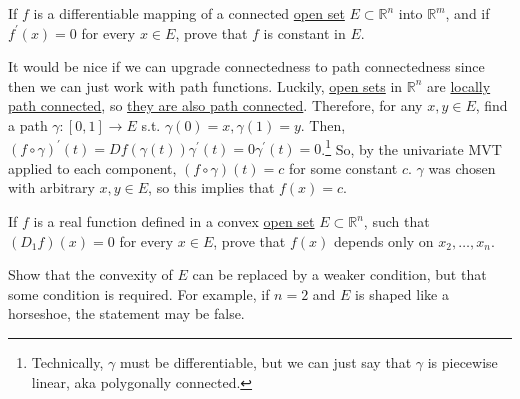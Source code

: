 	\begin{exercise}[Rudin 9.9]
		If $f$ is a differentiable mapping of a connected \hyperref[pst-def:open-set]{open set} $E\subset\mathbb{R}^n$ into $\mathbb{R}^m$, and if $f^\prime(x)=0$ for every $x\in E$, prove that $f$ is constant in $E$.
	\end{exercise}
	\begin{solution}
		It would be nice if we can upgrade connectedness to path connectedness since then we can just work with path functions. Luckily, \hyperref[pst-def:open-set]{open sets} in $\mathbb{R}^n$ are \hyperref[pst-def:locally_connected]{locally path connected}, so \hyperref[pst-thm:lpc_c_implies_pc]{they are also path connected}. Therefore, for any $x, y \in E$, find a path $\gamma: [0, 1] \to E$ s.t. $\gamma(0) = x, \gamma(1) = y$. Then, $(f \circ \gamma)^\prime (t) = Df(\gamma(t)) \gamma^\prime (t) = 0 \gamma^\prime(t) = 0$.\footnote{Technically, $\gamma$ must be differentiable, but we can just say that $\gamma$ is piecewise linear, aka polygonally connected.} So, by the univariate MVT applied to each component, $(f \circ \gamma)(t) = c$ for some constant $c$. $\gamma$ was chosen with arbitrary $x, y \in E$, so this implies that $f(x) = c$. 
	\end{solution}

	\begin{exercise}[Rudin 9.10]
		If $f$ is a real function defined in a convex \hyperref[pst-def:open-set]{open set} $E\subset\mathbb{R}^n$, such that $(D_1f)(x)=0$ for every $x\in E$, prove that $f(x)$ depends only on $x_2,\ldots,x_n$.

		Show that the convexity of $E$ can be replaced by a weaker condition, but that some condition is required. For example, if $n=2$ and $E$ is shaped like a horseshoe, the statement may be false.
	\end{exercise}

